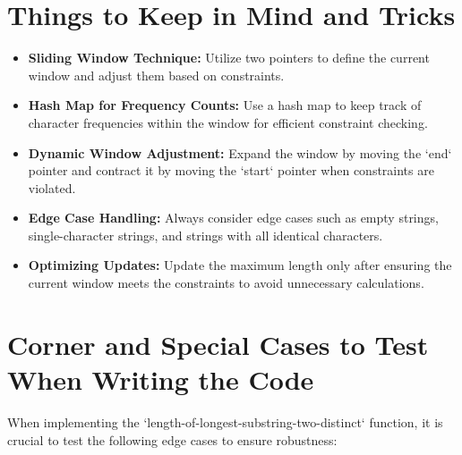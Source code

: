 \section*{Things to Keep in Mind and Tricks}

\begin{itemize}
    \item \textbf{Sliding Window Technique:} Utilize two pointers to define the current window and adjust them based on constraints.
    
    \item \textbf{Hash Map for Frequency Counts:} Use a hash map to keep track of character frequencies within the window for efficient constraint checking.
    
    \item \textbf{Dynamic Window Adjustment:} Expand the window by moving the `end` pointer and contract it by moving the `start` pointer when constraints are violated.
    
    \item \textbf{Edge Case Handling:} Always consider edge cases such as empty strings, single-character strings, and strings with all identical characters.
    
    \item \textbf{Optimizing Updates:} Update the maximum length only after ensuring the current window meets the constraints to avoid unnecessary calculations.
\end{itemize}

\section*{Corner and Special Cases to Test When Writing the Code}

When implementing the `length-of-longest-substring-two-distinct` function, it is crucial to test the following edge cases to ensure robustness:

